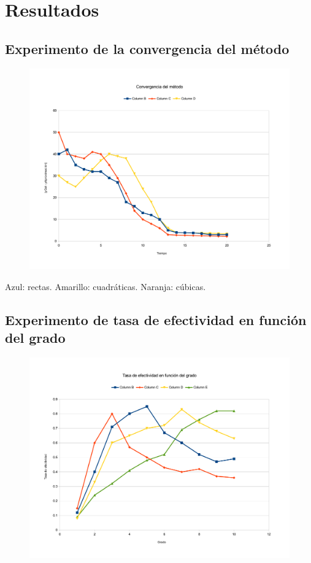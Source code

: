 \section{Resultados}

\subsection{Experimento de la convergencia del método}
\begin{figure}[H]{}
\centering
\includegraphics[scale=0.5]{graphs/convergenciaMetodo.pdf}
\label{convergenciaMetodo}
\end{figure}

Azul: rectas. Amarillo: cuadráticas. Naranja: cúbicas.

\subsection{Experimento de tasa de efectividad en función del grado}
\begin{figure}[H]{}
\centering
\includegraphics[scale=0.5]{graphs/TEvsGradoRECU.pdf}
\label{TEvsGrado}
\end{figure}

